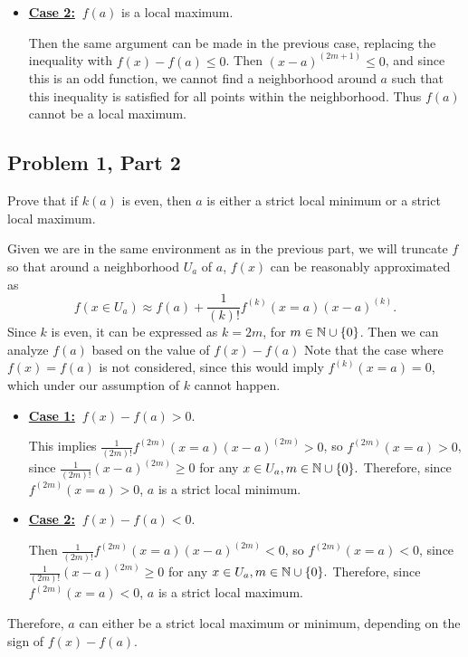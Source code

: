 \begin{solution}
\begin{itemize}[-]
        \item \underline{\textbf{Case 2:}} $ \ f(a)$ is a local maximum.

        \hop
        Then the same argument can be made in the previous case, replacing the inequality with $f(x) - f(a) \leq 0$. Then $(x - a)^{(2m+1)} \leq 0$, and since this is an odd function, we cannot find a neighborhood around $a$ such that this inequality is satisfied for all points within the neighborhood. Thus $f(a)$ cannot be a local maximum.
    \end{itemize}
\end{solution}

\newpage
\subsection{Problem 1, Part 2}
Prove that if $k(a)$ is even, then $a$ is either a strict local minimum or a strict local maximum.  
\partbreak
\begin{solution}

    Given we are in the same environment as in the previous part, we will truncate $f$ so that around a neighborhood $U_a$ of $a$, $f(x)$ can be reasonably approximated as 
    \[f(x \in U_a) \approx f(a) + \frac{1}{(k)!}f^{(k)}(x = a) (x - a)^{(k)}.\]
    Since $k$ is even, it can be expressed as $k = 2m$, for $m \in \mathbb{N} \cup \{0\}$. Then we can analyze $f(a)$ based on the value of $f(x) - f(a)$ Note that the case where $f(x) = f(a)$ is not considered, since this would imply $f^{(k)}(x = a) = 0$, which under our assumption of $k$ cannot happen.

    \begin{itemize}[-]
        \item \underline{\textbf{Case 1:}} $ \ f(x) - f(a) > 0 $. 

        \hop
         This implies $\frac{1}{(2m)!}f^{(2m)}(x = a) (x - a)^{(2m)} > 0$, so $f^{(2m)}(x = a) > 0$, since $\frac{1}{(2m)!}(x - a)^{(2m)} \geq 0$ for any $x \in U_a, m \in \mathbb{N} \cup \{0\}.$ Therefore, since $f^{(2m)}(x = a) > 0$, $a$ is a strict local minimum. 

         \item \underline{\textbf{Case 2:}} $ \ f(x) - f(a) < 0$.

         \hop
         Then $\frac{1}{(2m)!}f^{(2m)}(x = a) (x - a)^{(2m)} < 0$, so $f^{(2m)}(x = a) < 0$, since $\frac{1}{(2m)!}(x - a)^{(2m)} \geq 0$ for any $x \in U_a, m \in \mathbb{N} \cup \{0\}.$ Therefore, since $f^{(2m)}(x = a) < 0$, $a$ is a strict local maximum. 
    \end{itemize}

    Therefore, $a$ can either be a strict local maximum or minimum, depending on the sign of $f(x) - f(a)$.  
\end{solution}


